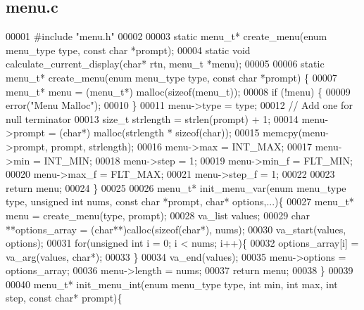 \subsection{menu.\+c}
\label{menu_8c_source}

\begin{DoxyCode}
00001 \textcolor{preprocessor}{#include "menu.h"}
00002 
00003 \textcolor{keyword}{static} menu_t* create_menu(\textcolor{keyword}{enum} menu_type type, \textcolor{keyword}{const} \textcolor{keywordtype}{char} *prompt);
00004 \textcolor{keyword}{static} \textcolor{keywordtype}{void} calculate_current_display(\textcolor{keywordtype}{char}* rtn, menu_t *menu);
00005 
00006 \textcolor{keyword}{static} menu_t* create_menu(\textcolor{keyword}{enum} menu_type type, \textcolor{keyword}{const} \textcolor{keywordtype}{char} *prompt) \{
00007   menu_t* menu = (menu_t*) malloc(\textcolor{keyword}{sizeof}(menu_t));
00008   \textcolor{keywordflow}{if} (!menu) \{
00009     error(\textcolor{stringliteral}{"Menu Malloc"});
00010   \}
00011   menu->type = type;
00012   \textcolor{comment}{// Add one for null terminator}
00013   \textcolor{keywordtype}{size\_t} strlength = strlen(prompt) + 1;
00014   menu->prompt = (\textcolor{keywordtype}{char}*) malloc(strlength * \textcolor{keyword}{sizeof}(\textcolor{keywordtype}{char}));
00015   memcpy(menu->prompt, prompt, strlength);
00016   menu->max = INT\_MAX;
00017   menu->min = INT\_MIN;
00018   menu->step = 1;
00019   menu->min_f = FLT\_MIN;
00020   menu->max_f = FLT\_MAX;
00021   menu->step_f = 1;
00022 
00023   \textcolor{keywordflow}{return} menu;
00024 \}
00025 
00026 menu_t* init_menu_var(\textcolor{keyword}{enum} menu_type type, \textcolor{keywordtype}{unsigned} \textcolor{keywordtype}{int} nums, \textcolor{keyword}{const} \textcolor{keywordtype}{char} *prompt, \textcolor{keywordtype}{char}* options,...)\{
00027   menu_t* menu = create_menu(type, prompt);
00028   va\_list values;
00029   \textcolor{keywordtype}{char} **options\_array = (\textcolor{keywordtype}{char}**)calloc(\textcolor{keyword}{sizeof}(\textcolor{keywordtype}{char}*), nums);
00030   va\_start(values, options);
00031   \textcolor{keywordflow}{for}(\textcolor{keywordtype}{unsigned} \textcolor{keywordtype}{int} i = 0; i < nums; i++)\{
00032     options\_array[i] = va\_arg(values, \textcolor{keywordtype}{char}*);
00033   \}
00034   va\_end(values);
00035   menu->options = options\_array;
00036   menu->length = nums;
00037   \textcolor{keywordflow}{return} menu;
00038 \}
00039 
00040 menu_t* init_menu_int(\textcolor{keyword}{enum} menu_type type, \textcolor{keywordtype}{int} min, \textcolor{keywordtype}{int} max, \textcolor{keywordtype}{int} step, \textcolor{keyword}{const} \textcolor{keywordtype}{char}* prompt)\{

\end{DoxyCode}
